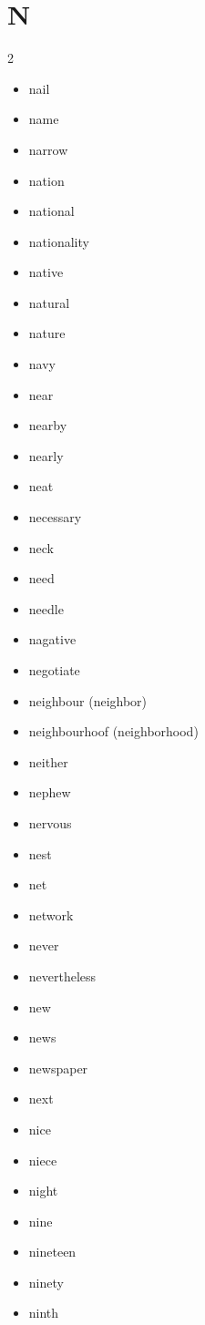 \documentclass[../../book.tex]{subfiles}
\begin{document}
\section{N}
\raggedcolumns
\begin{multicols}{2}
\begin{itemize}
\item[-] nail
\item[-] name
\item[-] narrow
\item[-] nation
\item[-] national
\item[-] nationality
\item[-] native
\item[-] natural
\item[-] nature
\item[-] navy
\item[-] near
\item[-] nearby
\item[-] nearly
\item[-] neat
\item[-] necessary
\item[-] neck
\item[-] need
\item[-] needle
\item[-] nagative
\item[-] negotiate
\item[-] neighbour (neighbor)
\item[-] neighbourhoof (neighborhood)
\item[-] neither
\item[-] nephew
\item[-] nervous
\item[-] nest
\item[-] net
\item[-] network
\item[-] never
\item[-] nevertheless
\item[-] new
\item[-] news
\item[-] newspaper
\item[-] next
\item[-] nice
\item[-] niece
\item[-] night
\item[-] nine
\item[-] nineteen
\item[-] ninety
\item[-] ninth

\end{itemize}
\end{multicols}
\end{document}
